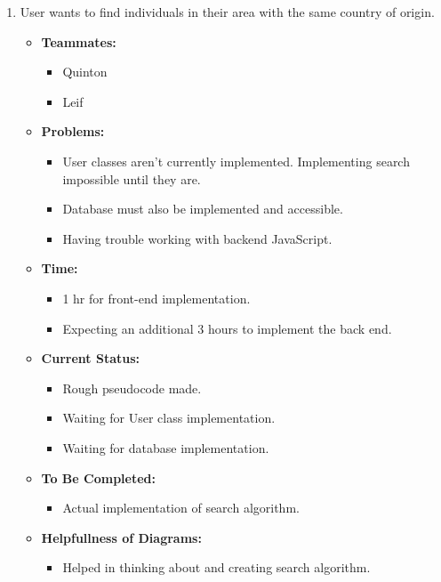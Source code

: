 \documentclass[12pt]{article}
\begin{document}
\begin{enumerate}
\begin{enumerate}
\begin{enumerate}
  \begin{enumerate}
    \item User wants to find individuals in their area with the same country of origin.
      \begin{itemize}
        \item \textbf{Teammates:}
          \begin{itemize}
            \item Quinton
            \item Leif
          \end{itemize}
        \item \textbf{Problems:}
          \begin{itemize}
            \item User classes aren’t currently implemented. Implementing search impossible until they are.
            \item Database must also be implemented and accessible.
            \item Having trouble working with backend JavaScript.
          \end{itemize}
        \item \textbf{Time:}
          \begin{itemize}
            \item 1 hr for front-end implementation.
            \item Expecting an additional 3 hours to implement the back end.
          \end{itemize}
        \item \textbf{Current Status:}
          \begin{itemize}
            \item Rough pseudocode made.
            \item Waiting for User class implementation.
            \item Waiting for database implementation.
          \end{itemize}
        \item \textbf{To Be Completed:}
          \begin{itemize}
            \item Actual implementation of search algorithm.
          \end{itemize}
        \item \textbf{Helpfullness of Diagrams:}
          \begin{itemize}
            \item Helped in thinking about and creating search algorithm.
          \end{itemize}
      \end{itemize}


\end{enumerate}
\end{enumerate}
\end{enumerate}
\end{enumerate}
\end{document}
